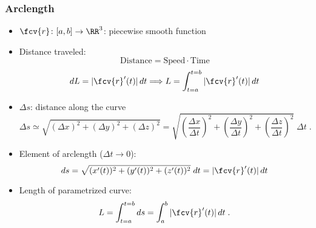 \begin{frame}
  \frametitle{Arclength}

  \begin{itemize}
    \item $\fcv{r}\colon [a,b] \to \RR^3$: piecewise smooth function
    \item Distance traveled:
    $$\text{Distance} = \text{Speed} \cdot \text{Time}$$
    $$dL = |\fcv{r}'(t)| \, dt \Longrightarrow L = \int_{t=a}^{t=b} |\fcv{r}'(t)| \, dt$$

    \item $\Delta s$: distance along the curve
    $$\Delta s \simeq \sqrt{(\Delta x)^2 + (\Delta y)^2 +
(\Delta z)^2} = \sqrt{\left(\frac{\Delta x}{\Delta t}
\right)^2 + \left(\frac{\Delta y}{\Delta t}\right)^2 +
\left(\frac{\Delta z}{\Delta t}\right)^2} \; \Delta t
\; .$$
%
\item Element of arclength ($\Delta t \to 0$):
%
$$ds = \sqrt{(x'(t))^2 + (y'(t))^2 + (z'(t))^2} \;
dt = |\fcv{r}'(t)| \, dt$$
%
\item Length of parametrized curve:
%
$$L = \int_{t=a}^{t=b} ds = \int_a^b |\fcv{r}'(t)| \, dt\; .$$
  \end{itemize}
\end{frame}